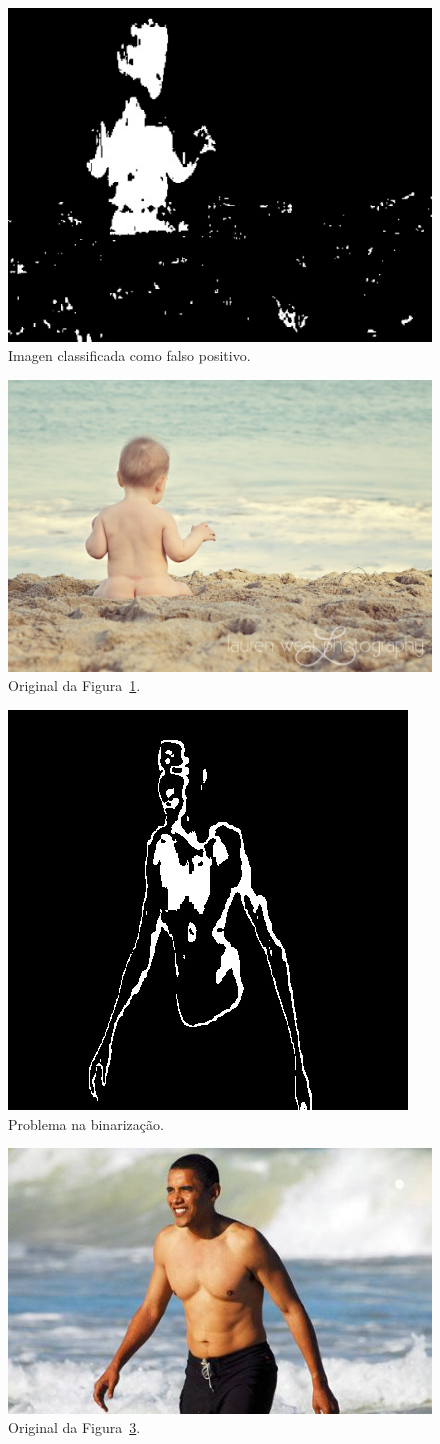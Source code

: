 \documentclass[conference]{Trabalho_1}
\begin{document}
\begin{figure}[!t]
  \centering
  \includegraphics[width = 4.5 cm]{fkpos}
  \caption{Imagen classificada como falso positivo.}
  \label{fig:fkpos}
\end{figure}

\begin{figure}[!t]
  \centering
  \includegraphics[width = 4.5 cm]{fkposf}
  \caption{Original da Figura~\ref{fig:fkpos}.}
  \label{fig:fkposf}
\end{figure}

\begin{figure}[!t]
  \centering
  \includegraphics[width = 4.5 cm]{fk}
  \caption{Problema na binariza\c{c}\~ao.}
  \label{fig:fk}
\end{figure}

\begin{figure}[!t]
  \centering
  \includegraphics[width = 4.5 cm]{fkf}
  \caption{Original da Figura~\ref{fig:fk}.}
  \label{fig:fkf}
\end{figure}
\end{document}
